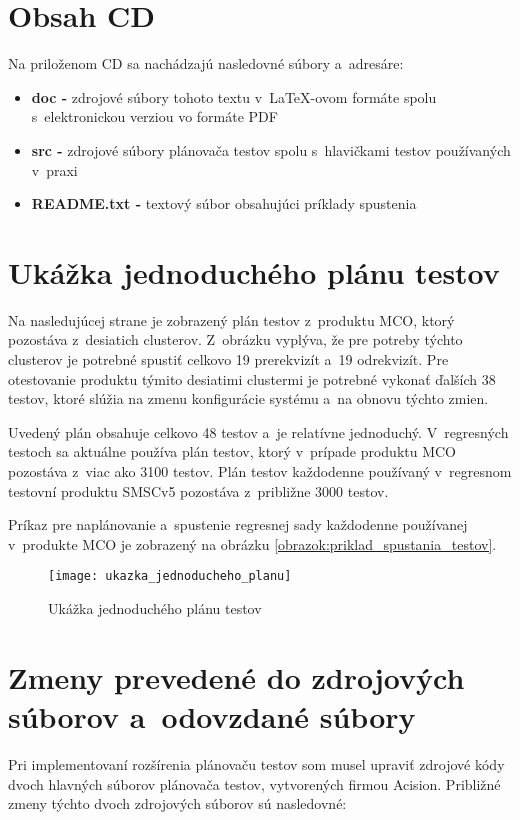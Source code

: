 %
%
\chapter{Obsah CD}
Na priloženom CD sa nachádzajú nasledovné súbory a~adresáre:
\begin{itemize}
\item \textbf{doc -} zdrojové súbory tohoto textu v~\LaTeX-ovom formáte 
spolu s~elektronickou verziou vo formáte PDF
\item \textbf{src -} zdrojové súbory plánovača testov spolu s~hlavičkami 
testov používaných v~praxi
\item \textbf{README.txt -} textový súbor obsahujúci príklady spustenia
\end{itemize}


%
%
\chapter{Ukážka jednoduchého plánu testov}
\label{priloha:jednoduchy_plan_testov}
Na nasledujúcej strane je zobrazený plán testov z~produktu MCO,
ktorý pozostáva z~desiatich clusterov. Z~obrázku vyplýva, že pre potreby
týchto clusterov je potrebné spustiť celkovo 19 prerekvizít a~19 
odrekvizít. Pre otestovanie produktu týmito desiatimi clustermi je 
potrebné vykonať ďalších 38 testov, ktoré slúžia na zmenu konfigurácie
systému a~na obnovu týchto zmien. 

Uvedený plán obsahuje celkovo 48 testov a~je relatívne jednoduchý.
V~regresných testoch sa aktuálne používa plán testov, ktorý v~prípade 
produktu MCO pozostáva z~viac ako 3100 testov.
Plán testov každodenne používaný v~regresnom testovní produktu SMSCv5 
pozostáva z~približne 3000 testov.

Príkaz pre naplánovanie a~spustenie regresnej sady každodenne 
používanej v~produkte MCO je zobrazený na obrázku 
\ref{obrazok:priklad_spustania_testov}.


\begin{figure}[h]
  \texttt{[image: ukazka\_jednoducheho\_planu]}
  \caption{Ukážka jednoduchého plánu testov}
\end{figure}



%
%
\chapter{Zmeny prevedené do zdrojových súborov a~odovzdané súbory}
\label{priloha:zmeny_do_zdrojakov}
Pri implementovaní rozšírenia plánovaču testov som musel upraviť zdrojové
kódy dvoch hlavných súborov plánovača testov, vytvorených firmou Acision.
Približné zmeny týchto dvoch zdrojových súborov sú nasledovné:

